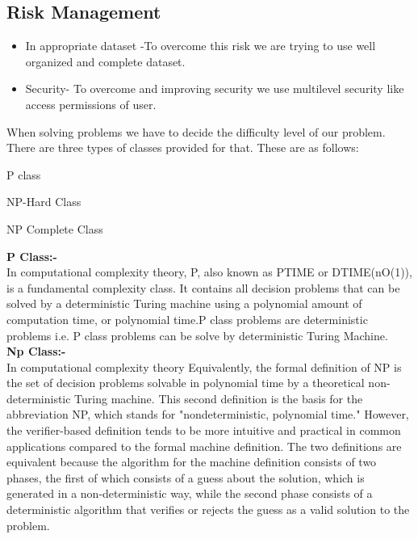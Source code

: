 \subsection{Risk Management}
\begin{itemize}
	\item	In appropriate dataset -To overcome this risk we are trying to use well organized and complete dataset. 
	\item	Security- To overcome and  improving  security we use multilevel security like access permissions of user.
\end{itemize}
When solving problems we have to decide the difficulty level of our problem. There are three types of classes provided for that. These are as follows:
\begin{itemize}
\end{itemize}
\textbf{P Class:-}\\
\justify\hspace{2cm}In computational complexity theory, P, also known as PTIME or DTIME(nO(1)), is a fundamental complexity class. It contains all decision problems that can be solved by a deterministic Turing machine using a polynomial amount of computation time, or polynomial time.P class problems are deterministic problems i.e. P class problems can be solve by deterministic Turing Machine.\\
\textbf{Np Class:-}\\
\justify\hspace{2cm}In computational complexity theory Equivalently, the formal definition of NP is the set of decision problems solvable in polynomial time by a theoretical non-deterministic Turing machine. This second definition is the basis for the abbreviation NP, which stands for "nondeterministic, polynomial time." However, the verifier-based definition tends to be more intuitive and practical in common applications compared to the formal machine definition. The two definitions are equivalent because the algorithm for the machine definition consists of two phases, the first of which consists of a guess about the solution, which is generated in a non-deterministic way, while the second phase consists of a deterministic algorithm that verifies or rejects the guess as a valid solution to the problem.\\

